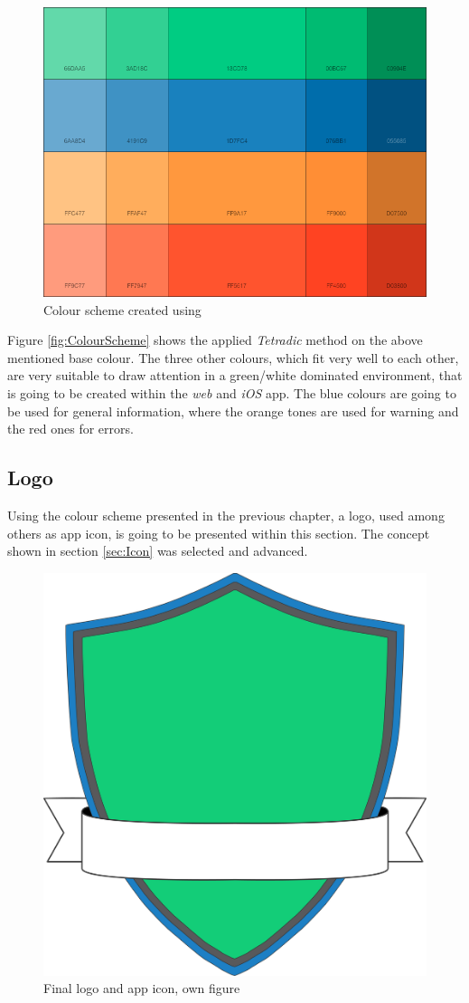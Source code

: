 \begin{figure}[h]
  	\centering
  	\includegraphics[width=0.95\linewidth]{./images/color-palette.png}
  	\caption{Colour scheme created using \cite{Paletton:2015aa}}
	\label{fig:ColourScheme}
\end{figure}

Figure \vref{fig:ColourScheme} shows the applied \emph{Tetradic} method on the above mentioned base colour. The three other colours, which fit very well to each other, are very suitable to draw attention in a green/white dominated environment, that is going to be created within the \emph{web} and \emph{iOS} app. The blue colours are going to be used for general information, where the orange tones are used for warning and the red ones for errors.

\subsection{Logo}
\label{sec:Logo}
Using the colour scheme presented in the previous chapter, a logo, used among others as app icon, is going to be presented within this section. The concept shown in section \vref{sec:Icon} was selected and advanced. 

\begin{figure}[h]
  	\centering
  	\includegraphics[width=0.45\linewidth]{./images/logo-final.png}
  	\caption{Final logo and app icon, own figure}
	\label{fig:Logo}
\end{figure}


